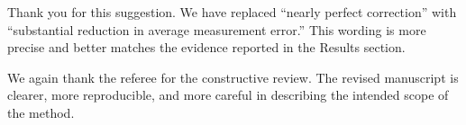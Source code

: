 \begin{authorreply}
Thank you for this suggestion. We have replaced ``nearly perfect correction'' with ``substantial reduction in average measurement error.'' This wording is more precise and better matches the evidence reported in the Results section.
\end{authorreply}

\vspace{1em}
We again thank the referee for the constructive review. The revised manuscript is clearer, more reproducible, and more careful in describing the intended scope of the method.
